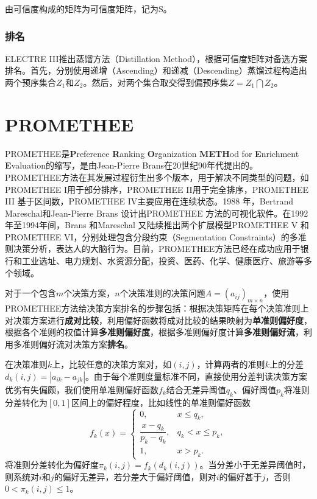 由可信度构成的矩阵为可信度矩阵，记为S。

\subsection{排名}
ELECTRE III推出蒸馏方法（Distillation Method），根据可信度矩阵对备选方案排名。首先，分别使用递增（Ascending）和递减（Descending）蒸馏过程构造出两个预序集合$Z_1$和$Z_2$。然后，对两个集合取交得到偏预序集$Z=Z_1\bigcap Z_2$。

\chapter{PROMETHEE}
PROMETHEE是\textbf{P}reference \textbf{R}anking \textbf{O}rganization \textbf{METH}od for \textbf{E}nrichment \textbf{E}valuation的缩写，是由Jean-Pierre Brans\cite{mareschal1984promethee,brans1985note,brans1986select,brans2005promethee}在20世纪90年代提出的。PROMETHEE方法在其发展过程衍生出多个版本，用于解决不同类型的问题，如PROMETHEE I用于部分排序，PROMETHEE II用于完全排序，PROMETHEE III 基于区间数，PROMETHEE IV主要应用在连续状态。1988 年，Bertrand Mareschal和Jean-Pierre Brans\cite{mareschal1988geometrical} 设计出PROMETHEE 方法的可视化软件。在1992年至1994年间，Brans 和Mareschal 又陆续推出两个扩展模型PROMETHEE V 和PROMETHEE VI，分别处理包含分段约束（Segmentation Constraints）的多准则决策分析，表达人的大脑行为。目前，PROMETHEE方法已经在成功应用于银行和工业选址、电力规划、水资源分配，投资、医药、化学、健康医疗、旅游等多个领域。

对于一个包含$m$个决策方案，$n$个决策准则的决策问题$A=(a_{ij})_{m\times n}$，使用PROMETHEE方法给决策方案排名的步骤包括：根据决策矩阵在每个决策准则上对决策方案进行\textbf{成对比较}，利用偏好函数将成对比较的结果映射为\textbf{单准则偏好度}，根据各个准则的权值计算\textbf{多准则偏好度}，根据多准则偏好度计算\textbf{多准则偏好流}，利用多准则偏好流对决策方案\textbf{排名}。

在决策准则$k$上，比较任意的决策方案对，如$(i,j)$，计算两者的准则$k$上的分差$d_k(i,j)=|a_{ik}-a_{jk}|$。由于每个准则度量标准不同，直接使用分差判读决策方案优劣有失偏颇，我们使用单准则偏好函数$f_k$结合无差异阈值$q_k$、偏好阈值$p_k$将准则分差转化为$[0,1]$区间上的偏好程度，比如线性的单准则偏好函数
\begin{equation}
    f_k(x) = \left\{
        \begin{array}{ll}
          0, & x \le q_k, \\
          \dfrac{x-q_k}{p_k-q_k}, & q_k < x \le p_k, \\
          1, & x > p_k.
        \end{array}
    \right.
\end{equation}
将准则分差转化为偏好度$\pi_k(i,j)=f_k(d_k(i,j))$。当分差小于无差异阈值时，则系统对$i$和$j$的偏好无差异，若分差大于偏好阈值，则对$i$的偏好甚于$j$，否则$0<\pi_k(i,j)\le 1$。

